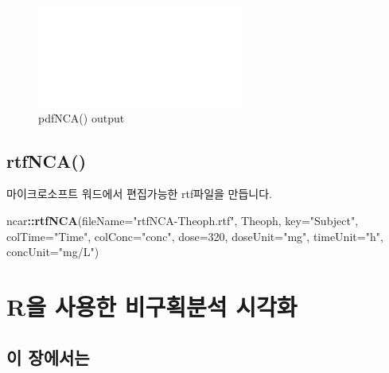 \documentclass[
  12pt,
]{krantz}
\newenvironment{Shaded}{\begin{snugshade}}{\end{snugshade}}
\newcommand{\DataTypeTok}[1]{\textcolor[rgb]{0.13,0.29,0.53}{#1}}
\newcommand{\DecValTok}[1]{\textcolor[rgb]{0.00,0.00,0.81}{#1}}
\newcommand{\KeywordTok}[1]{\textcolor[rgb]{0.13,0.29,0.53}{\textbf{#1}}}
\newcommand{\NormalTok}[1]{#1}
\newcommand{\OperatorTok}[1]{\textcolor[rgb]{0.81,0.36,0.00}{\textbf{#1}}}
\newcommand{\StringTok}[1]{\textcolor[rgb]{0.31,0.60,0.02}{#1}}
\begin{document}
\begin{figure}
\includegraphics[width=1\linewidth]{Output-ncar/montage} \caption{pdfNCA() output}\label{fig:pdfnca-output}
\end{figure}

\hypertarget{rtfnca}{%
\section{rtfNCA()}\label{rtfnca}}

마이크로소프트 워드에서 편집가능한 rtf파일을 만듭니다.

\begin{Shaded}
\begin{Highlighting}[]
\NormalTok{ncar}\OperatorTok{::}\KeywordTok{rtfNCA}\NormalTok{(}\DataTypeTok{fileName=}\StringTok{"rtfNCA{-}Theoph.rtf"}\NormalTok{, Theoph, }\DataTypeTok{key=}\StringTok{"Subject"}\NormalTok{, }
             \DataTypeTok{colTime=}\StringTok{"Time"}\NormalTok{, }\DataTypeTok{colConc=}\StringTok{"conc"}\NormalTok{, }\DataTypeTok{dose=}\DecValTok{320}\NormalTok{, }\DataTypeTok{doseUnit=}\StringTok{"mg"}\NormalTok{, }
             \DataTypeTok{timeUnit=}\StringTok{"h"}\NormalTok{, }\DataTypeTok{concUnit=}\StringTok{"mg/L"}\NormalTok{)}
\end{Highlighting}
\end{Shaded}

\hypertarget{pkr}{%
\chapter{R을 사용한 비구획분석 시각화}\label{pkr}}

\hypertarget{summary-pkr}{%
\section{이 장에서는}\label{summary-pkr}}
\end{document}
